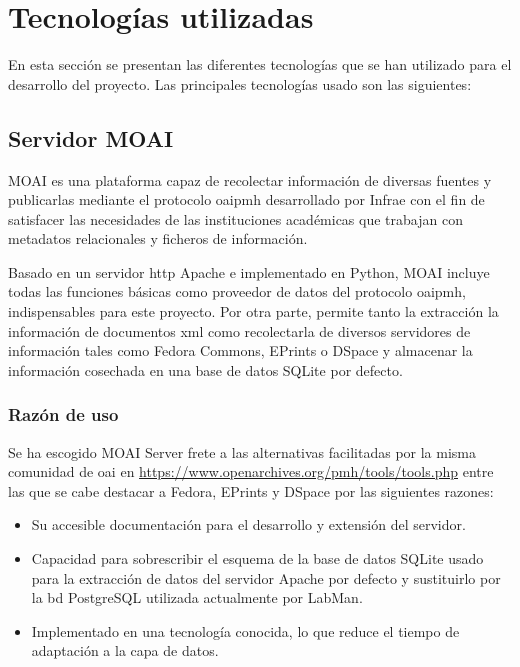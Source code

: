 \chapter{Tecnologías utilizadas}

En esta sección se presentan las diferentes tecnologías que se han utilizado para el desarrollo del proyecto. Las principales tecnologías usado son las siguientes:

\section{Servidor MOAI}

MOAI\cite{MOAI} es una plataforma capaz de recolectar información de diversas fuentes y publicarlas mediante el protocolo \acrshort{oaipmh} desarrollado por Infrae\cite{Infrae} con el fin de satisfacer las necesidades de las instituciones académicas que trabajan con metadatos relacionales y ficheros de información.

Basado en un servidor \acrshort{http} Apache\cite{HTTPApache} e implementado en Python\cite{Python}, MOAI incluye todas las funciones básicas como proveedor de datos del protocolo \acrshort{oaipmh}, indispensables para este proyecto. Por otra parte, permite tanto la extracción la información de documentos \acrshort{xml} como recolectarla de diversos servidores de información tales como Fedora Commons\cite{Fedora}, EPrints\cite{EPrints} o DSpace\cite{DSpace} y almacenar la información cosechada en una base de datos SQLite\cite{SQLite} por defecto.

\subsection{Razón de uso}

Se ha escogido MOAI Server frete a las alternativas facilitadas por la misma comunidad de \acrshort{oai} en \url{https://www.openarchives.org/pmh/tools/tools.php} entre las que se cabe destacar a Fedora, EPrints y DSpace por las siguientes razones:

\begin{itemize}
	\item Su accesible documentación para el desarrollo y extensión del servidor.
	\item Capacidad para sobrescribir el esquema de la base de datos SQLite usado para la extracción de datos del servidor Apache por defecto y sustituirlo por la \acrshort{bd} PostgreSQL\cite{PostgreSQL} utilizada actualmente por LabMan.
	\item Implementado en una tecnología conocida, lo que reduce el tiempo de adaptación a la capa de datos.
\end{itemize}

